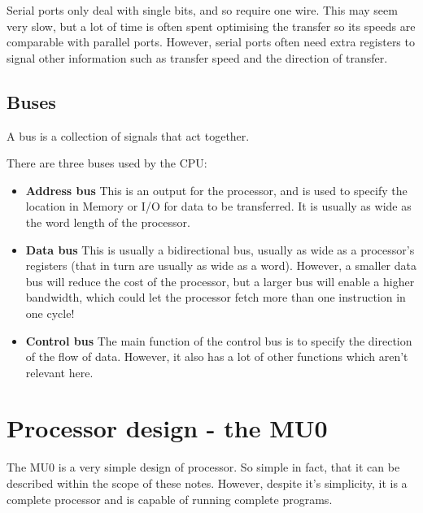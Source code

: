 Serial ports only deal with single bits, and so require one wire. This may seem
very slow, but a lot of time is often spent optimising the transfer so its
speeds are comparable with parallel ports. However, serial ports often need
extra registers to signal other information such as transfer speed and the
direction of transfer.

\subsection{Buses}

A bus is a collection of signals that act together.

There are three buses used by the CPU:

\begin{itemize}
	\item {\bf Address bus}
		This is an output for the processor, and is used to specify the location
		in Memory or I/O for data to be transferred. It is usually as wide as
		the word length of the processor.
	
	\item {\bf Data bus}
		This is usually a bidirectional bus, usually as wide as a processor's
		registers (that in turn are usually as wide as a word). However, a
		smaller data bus will reduce the cost of the processor, but a larger bus
		will enable a higher bandwidth, which could let the processor fetch more
		than one instruction in one cycle!

	\item {\bf Control bus}
		The main function of the control bus is to specify the direction of the
		flow of data. However, it also has a lot of other functions which aren't
		relevant here.
\end{itemize}

\section{Processor design - the MU0}

The MU0 is a very simple design of processor. So simple in fact, that it can be
described within the scope of these notes. However, despite it's simplicity, it
is a complete processor and is capable of running complete programs.

